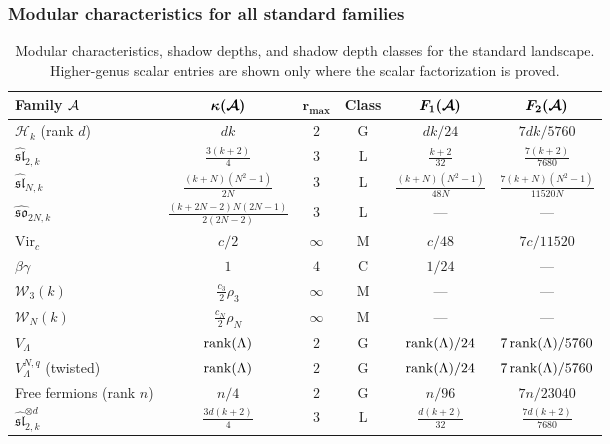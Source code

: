 \subsubsection{Modular characteristics for all standard families}

\begin{table}[ht]
\centering
\caption{Modular characteristics, shadow depths, and shadow depth classes for the standard landscape. Higher-genus scalar entries are shown only where the scalar factorization is proved.}
\label{tab:thqg-I-modular-characteristics}
\renewcommand{\arraystretch}{1.4}
{\footnotesize
\begin{tabular}{|l|c|c|c|c|c|}
\hline
\textbf{Family $\mathcal{A}$} & $\boldsymbol{\kappa(\mathcal{A})}$ & $\boldsymbol{r_{\max}}$ & \textbf{Class} & $\boldsymbol{F_1(\mathcal{A})}$ & $\boldsymbol{F_2(\mathcal{A})}$ \\
\hline
$\mathcal{H}_k$ (rank $d$) & $dk$ & $2$ & G & $dk/24$ & $7dk/5760$ \\
\hline
$\widehat{\mathfrak{sl}}_{2,k}$ & $\frac{3(k+2)}{4}$ & $3$ & L & $\frac{k+2}{32}$ & $\frac{7(k+2)}{7680}$ \\
\hline
$\widehat{\mathfrak{sl}}_{N,k}$ & $\frac{(k+N)(N^2-1)}{2N}$ & $3$ & L & $\frac{(k+N)(N^2-1)}{48N}$ & $\frac{7(k+N)(N^2-1)}{11520N}$ \\
\hline
$\widehat{\mathfrak{so}}_{2N,k}$ & $\frac{(k+2N-2)N(2N-1)}{2(2N-2)}$ & $3$ & L & --- & --- \\
\hline
$\mathrm{Vir}_c$ & $c/2$ & $\infty$ & M & $c/48$ & $7c/11520$ \\
\hline
$\beta\gamma$ & $1$ & $4$ & C & $1/24$ & --- \\
\hline
$\mathcal{W}_3(k)$ & $\frac{c_3}{2} \rho_3$ & $\infty$ & M & --- & --- \\
\hline
$\mathcal{W}_N(k)$ & $\frac{c_N}{2} \rho_N$ & $\infty$ & M & --- & --- \\
\hline
$V_\Lambda$ & $\operatorname{rank}(\Lambda)$ & $2$ & G & $\operatorname{rank}(\Lambda)/24$ & $7\operatorname{rank}(\Lambda)/5760$ \\
\hline
$V_\Lambda^{N,q}$ (twisted) & $\operatorname{rank}(\Lambda)$ & $2$ & G & $\operatorname{rank}(\Lambda)/24$ & $7\operatorname{rank}(\Lambda)/5760$ \\
\hline
Free fermions (rank $n$) & $n/4$ & $2$ & G & $n/96$ & $7n/23040$ \\
\hline
$\widehat{\mathfrak{sl}}_{2,k}^{\otimes d}$ & $\frac{3d(k+2)}{4}$ & $3$ & L & $\frac{d(k+2)}{32}$ & $\frac{7d(k+2)}{7680}$ \\
\hline
\end{tabular}}
\end{table}

